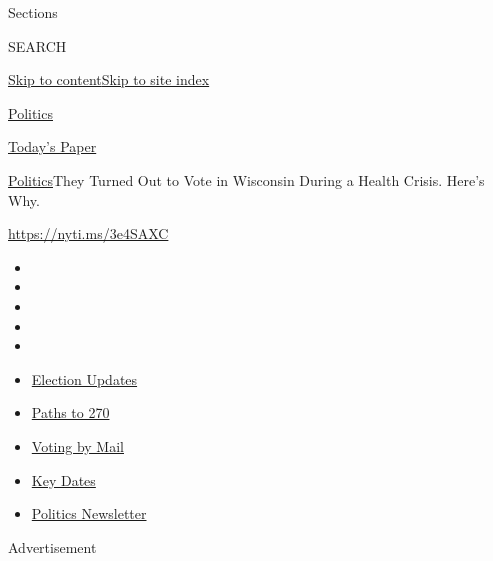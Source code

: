 Sections

SEARCH

\protect\hyperlink{site-content}{Skip to
content}\protect\hyperlink{site-index}{Skip to site index}

\href{https://www.nytimes3xbfgragh.onion/section/politics}{Politics}

\href{https://myaccount.nytimes3xbfgragh.onion/auth/login?response_type=cookie\&client_id=vi}{}

\href{https://www.nytimes3xbfgragh.onion/section/todayspaper}{Today's
Paper}

\href{/section/politics}{Politics}\textbar{}They Turned Out to Vote in
Wisconsin During a Health Crisis. Here's Why.

\url{https://nyti.ms/3e4SAXC}

\begin{itemize}
\item
\item
\item
\item
\item
\end{itemize}

\begin{itemize}
\item
  \href{https://www.nytimes3xbfgragh.onion/live/2020/09/07/us/trump-vs-biden?action=click\&pgtype=Article\&state=default\&region=TOP_BANNER\&context=storylines_menu}{Election
  Updates}
\item
  \href{https://www.nytimes3xbfgragh.onion/interactive/2020/us/elections/election-states-biden-trump.html?action=click\&pgtype=Article\&state=default\&region=TOP_BANNER\&context=storylines_menu}{Paths
  to 270}
\item
  \href{https://www.nytimes3xbfgragh.onion/interactive/2020/08/31/us/politics/vote-by-mail-deadlines.html?action=click\&pgtype=Article\&state=default\&region=TOP_BANNER\&context=storylines_menu}{Voting
  by Mail}
\item
  \href{https://www.nytimes3xbfgragh.onion/interactive/2019/us/elections/2020-presidential-election-calendar.html?action=click\&pgtype=Article\&state=default\&region=TOP_BANNER\&context=storylines_menu}{Key
  Dates}
\item
  \href{https://www.nytimes3xbfgragh.onion/newsletters/politics?action=click\&pgtype=Article\&state=default\&region=TOP_BANNER\&context=storylines_menu}{Politics
  Newsletter}
\end{itemize}

Advertisement

